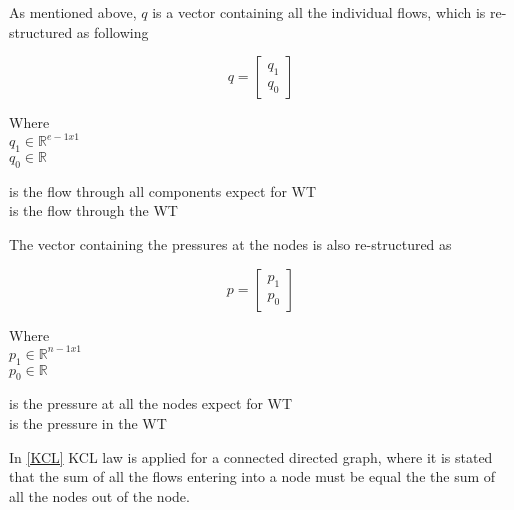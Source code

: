 As mentioned above, $q$ is a vector containing all the individual flows, which 
is re-structured as following

\begin{equation}
q =
\begin{bmatrix}
         q_1 \\
	q_0 
\end{bmatrix}
\end{equation}

\begin{minipage}[t]{0.20\textwidth}
Where\\
\hspace*{8mm} $q_1 \in \mathbb{R}^{e-1x1}$  \\
\hspace*{8mm} $q_0 \in \mathbb{R} $ 
\end{minipage}
\begin{minipage}[t]{0.68\textwidth}
\vspace*{2mm}
\hspace*{4mm} is the flow through all components expect for WT\\
\hspace*{4mm} is the flow through the WT 
\end{minipage}

The vector containing the pressures at the nodes is also re-structured as

\begin{equation}
p =
\begin{bmatrix}
         p_1 \\
	p_0 
\end{bmatrix}
\end{equation}

\begin{minipage}[t]{0.20\textwidth}
Where\\
\hspace*{8mm} $p_1 \in \mathbb{R}^{n-1x1}$  \\
\hspace*{8mm} $p_0 \in \mathbb{R} $ 
\end{minipage}
\begin{minipage}[t]{0.68\textwidth}
\vspace*{2mm}
\hspace*{4mm} is the pressure at all the nodes expect for WT\\
\hspace*{4mm} is the pressure in the WT 
\end{minipage}

In \eqref{KCL} KCL law is applied for a connected directed graph, where it is stated that the sum of all the flows entering 
into a node must be equal the the sum of all the nodes out of the node.


